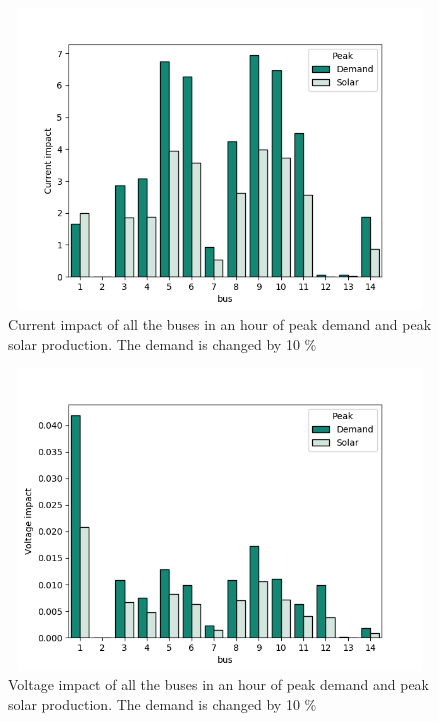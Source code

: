 \documentclass[class=book, crop=false, 11pt]{standalone}
\begin{document}
\begin{figure}[h]
    \center
\includegraphics[height=8cm, width=12cm]{figures/current_impact_demand_solar.png}
    \caption {Current impact of all the buses in an hour of peak demand and peak solar production. The demand is changed by 10 \%}
    \label{fig:discussion:current_impact_demand_solar}
\end{figure}

\begin{figure}[h]
    \center
\includegraphics[height=8cm, width=12cm]{figures/voltage_impact_demand_solar.png}
    \caption {Voltage impact of all the buses in an hour of peak demand and peak solar production. The demand is changed by 10 \%}
    \label{fig:discussion:voltage_impact_demand_solar}
\end{figure}
\end{document}

